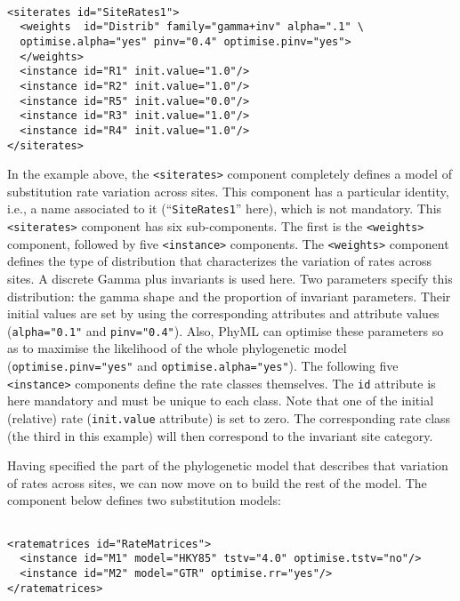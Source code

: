 \documentclass[a4paper,12pt]{article}
\newcommand{\x}[1]{\texttt{#1}}
\begin{document}
\vspace{0.2cm}
\begin{Verbatim}[frame=single, label=$\Gamma4$+I rates, samepage=true, baselinestretch=0.5]

<siterates id="SiteRates1">
  <weights  id="Distrib" family="gamma+inv" alpha=".1" \
  optimise.alpha="yes" pinv="0.4" optimise.pinv="yes">
  </weights>
  <instance id="R1" init.value="1.0"/>
  <instance id="R2" init.value="1.0"/>
  <instance id="R5" init.value="0.0"/>
  <instance id="R3" init.value="1.0"/>
  <instance id="R4" init.value="1.0"/>
</siterates>

\end{Verbatim}

In the example above, the \x{<siterates>} component  completely defines a model of substitution rate
variation across  sites. This component  has a  particular identity, i.e.,  a name associated  to it
(``\x{SiteRates1}''  here),  which  is  not  mandatory.   This  \x{<siterates>}  component  has  six
sub-components.   The  first  is  the  \x{<weights>}  component,  followed  by  five  \x{<instance>}
components. The  \x{<weights>} component  defines the  type of  distribution that  characterizes the
variation of  rates across sites.  A discrete  Gamma plus invariants  is used here.   Two parameters
specify this distribution: the gamma shape and the proportion of invariant parameters. Their initial
values  are set  by using  the corresponding  attributes and  attribute values  (\x{alpha="0.1"} and
\x{pinv="0.4"}). Also, PhyML can  optimise these parameters so as to maximise  the likelihood of the
whole phylogenetic model (\x{optimise.pinv="yes"}  and \x{optimise.alpha="yes"}). The following five
\x{<instance>}  components  define  the  rate  classes themselves.  The  \x{id}  attribute  is  here
mandatory  and must  be  unique  to each  class.   Note  that one  of  the  initial (relative)  rate
(\x{init.value} attribute) is set to zero. The  corresponding rate class (the third in this example)
will then correspond to the invariant site category.

Having specified the  part of the phylogenetic  model that describes that variation  of rates across
sites,  we can  now move  on  to build  the rest  of the  model.   The component  below defines  two
substitution models:

\vspace{0.2cm}
\begin{Verbatim}[frame=single, label=Rate matrices, samepage=true, baselinestretch=0.5]

<ratematrices id="RateMatrices">
  <instance id="M1" model="HKY85" tstv="4.0" optimise.tstv="no"/>
  <instance id="M2" model="GTR" optimise.rr="yes"/>
</ratematrices>
\end{Verbatim}
\end{document}
